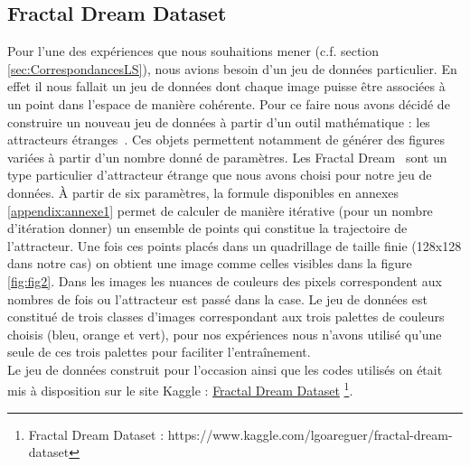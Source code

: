 \documentclass[11pt,francais]{article}
\begin{document}
\subsection{Fractal Dream Dataset}
\label{sec:FDD}
Pour l'une des expériences que nous souhaitions mener (c.f. section \ref{sec:CorrespondancesLS}), nous avions besoin d'un jeu de données particulier. 
En effet il nous fallait un jeu de données dont chaque image puisse être associées à un point dans l'espace de manière cohérente. 
Pour ce faire nous avons décidé de construire un nouveau jeu de données à partir d'un outil mathématique : les attracteurs étranges~\cite{Pickover}. Ces objets permettent notamment de générer des figures variées à partir d'un nombre donné de paramètres.
Les Fractal Dream~\cite{Pickover} sont un type particulier d'attracteur étrange que nous avons choisi pour notre jeu de données. À partir de six paramètres, la formule disponibles en annexes \ref{appendix:annexe1} permet de calculer de manière itérative (pour un nombre d'itération donner) un ensemble de points qui constitue la trajectoire de l'attracteur. Une fois ces points placés dans un quadrillage de taille finie (128x128 dans notre cas) on obtient une image comme celles visibles dans la figure \ref{fig:fig2}. Dans les images les nuances de couleurs des pixels correspondent aux nombres de fois ou l'attracteur est passé dans la case. 
Le jeu de données est constitué de trois classes d'images correspondant aux trois palettes de couleurs choisis (bleu, orange et vert), pour nos expériences nous n'avons utilisé qu'une seule de ces trois palettes pour faciliter l'entraînement.\\
Le jeu de données construit pour l'occasion ainsi que les codes utilisés on était mis à disposition sur le site Kaggle : \href{https://www.kaggle.com/lgoareguer/fractal-dream-dataset}{Fractal Dream Dataset} \footnote{\label{note3}Fractal Dream Dataset : https://www.kaggle.com/lgoareguer/fractal-dream-dataset}.
\end{document}
